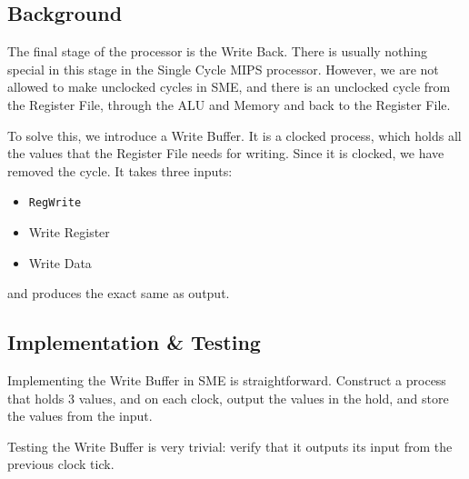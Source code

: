 \documentclass{beamer}
\begin{document}
\subsection{Background}
\begin{frame}
    The final stage of the processor is the Write Back. There is usually
    nothing special in this stage in the Single Cycle MIPS processor. However,
    we are not allowed to make unclocked cycles in SME, and there is an
    unclocked cycle from the Register File, through the ALU and Memory and back
    to the Register File.
\end{frame}
\begin{frame}
    \vspace{\baselineskip}
    To solve this, we introduce a Write Buffer. It is a clocked process, which
    holds all the values that the Register File needs for writing. Since it is
    clocked, we have removed the cycle. It takes three inputs:
    \begin{itemize}
        \item \texttt{RegWrite}
        \item Write Register
        \item Write Data
    \end{itemize}
    and produces the exact same as output.
\end{frame}
\begin{frame}
    \begin{figure}
    \end{figure}
\end{frame}
\subsection{Implementation \& Testing}
\begin{frame}
    Implementing the Write Buffer in SME is straightforward. Construct a
    process that holds 3 values, and on each clock, output the values in the
    hold, and store the values from the input.

    \vspace{\baselineskip}
    Testing the Write Buffer is very trivial: verify that it outputs its input
    from the previous clock tick.
\end{frame}
\end{document}
